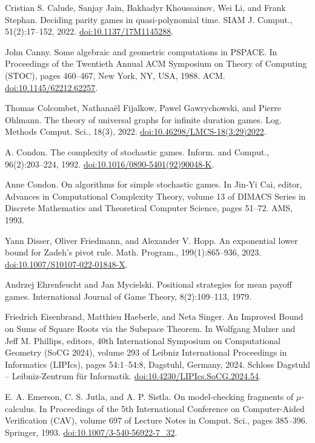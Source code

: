  Cristian S. Calude, Sanjay Jain, Bakhadyr Khoussainov, Wei Li, and Frank Stephan. Deciding parity games in quasi-polynomial time. SIAM J. Comput., 51(2):17–152, 2022. \href{https://doi.org/10.1137/17M1145288}{doi:10.1137/17M1145288}.

 John Canny. Some algebraic and geometric computations in PSPACE. In Proceedings of the Twentieth Annual ACM Symposium on Theory of Computing (STOC), pages 460–467, New York, NY, USA, 1988. ACM. \href{https://doi.org/10.1145/62212.62257}{doi:10.1145/62212.62257}.

 Thomas Colcombet, Nathanaël Fijalkow, Pawel Gawrychowski, and Pierre Ohlmann. The theory of universal graphs for infinite duration games. Log. Methods Comput. Sci., 18(3), 2022. \href{https://doi.org/10.46298/LMCS-18(3:29)2022}{doi:10.46298/LMCS-18(3:29)2022}.

 A. Condon. The complexity of stochastic games. Inform. and Comput., 96(2):203–224, 1992. \href{https://doi.org/10.1016/0890-5401(92)90048-K}{doi:10.1016/0890-5401(92)90048-K}.

 Anne Condon. On algorithms for simple stochastic games. In Jin-Yi Cai, editor, Advances in Computational Complexity Theory, volume 13 of DIMACS Series in Discrete Mathematics and Theoretical Computer Science, pages 51–72. AMS, 1993.

 Yann Disser, Oliver Friedmann, and Alexander V. Hopp. An exponential lower bound for Zadeh’s pivot rule. Math. Program., 199(1):865–936, 2023. \href{https://doi.org/10.1007/S10107-022-01848-X}{doi:10.1007/S10107-022-01848-X}.

 Andrzej Ehrenfeucht and Jan Mycielski. Positional strategies for mean payoff games. International Journal of Game Theory, 8(2):109–113, 1979.

 Friedrich Eisenbrand, Matthieu Haeberle, and Neta Singer. An Improved Bound on Sums of Square Roots via the Subspace Theorem. In Wolfgang Mulzer and Jeff M. Phillips, editors, 40th International Symposium on Computational Geometry (SoCG 2024), volume 293 of Leibniz International Proceedings in Informatics (LIPIcs), pages 54:1–54:8, Dagstuhl, Germany, 2024. Schloss Dagstuhl – Leibniz-Zentrum für Informatik. \href{https://doi.org/10.4230/LIPIcs.SoCG.2024.54}{doi:10.4230/LIPIcs.SoCG.2024.54}.

 E. A. Emerson, C. S. Jutla, and A. P. Sistla. On model-checking fragments of $\mu$-calculus. In Proceedings of the 5th International Conference on Computer-Aided Verification (CAV), volume 697 of Lecture Notes in Comput. Sci., pages 385–396. Springer, 1993. \href{https://doi.org/10.1007/3-540-56922-7_32}{doi:10.1007/3-540-56922-7\_32}.


